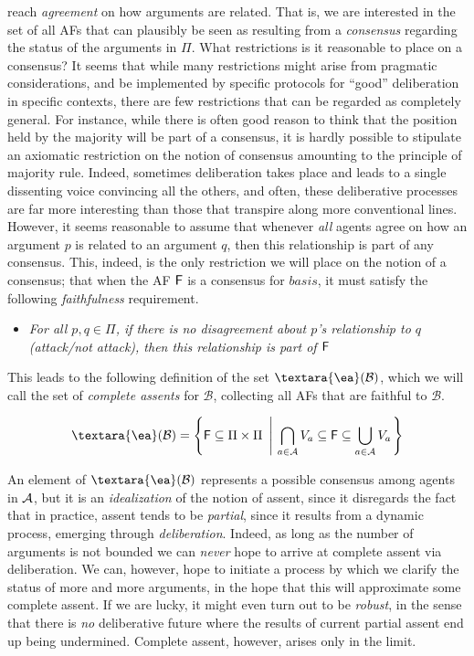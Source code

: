 \documentclass[greybox]{svmult}
\newcommand{\cons}[1]{{\textara{\ea}}(#1)}
\newcommand{\af}{{\sf F}}
\newcommand{\basis}{basis }
\newcommand{\views}{\mathcal B}
\begin{document}
 reach \emph{agreement} on how arguments are related. That is, we are interested in the set of all AFs that can plausibly be seen as resulting from a \emph{consensus} regarding the status of the arguments in $\Pi$. What restrictions is it reasonable to place on a consensus? It seems that while many restrictions might arise from pragmatic considerations, and be implemented by specific protocols for ``good'' deliberation in specific contexts, there are few restrictions that can be regarded as completely general. For instance, while there is often good reason to think that the position held by the majority will be part of a consensus, it is hardly possible to stipulate an axiomatic restriction on the notion of consensus amounting to the principle of majority rule. Indeed, sometimes deliberation takes place and leads to a single dissenting voice convincing all the others, and often, these deliberative processes are far more interesting than those that transpire along more conventional lines. However, it seems reasonable to assume that whenever \emph{all} agents agree on how an argument $p$ is related to an argument $q$, then this relationship is part of any consensus. This, indeed, is the only restriction we will place on the notion of a consensus; that when the AF $\af$ is a consensus for $\basis$, it must satisfy the following \emph{faithfulness} requirement.

\begin{itemize}
\item \emph{For all $p,q \in \Pi$, if there is no disagreement about $p$'s relationship to $q$ (attack/not attack), then this relationship is part of $\af$}
\end{itemize}

This leads to the following definition of the set $\cons \views$, which we will call the set of \emph{complete assents} for $\views$, collecting all AFs that are faithful to $\views$.

\begin{equation}\label{def:consensus}
\cons \views = \left\{\af \subseteq \Pi \times \Pi ~\left|~ \bigcap_{a \in \agents}V_a \subseteq \af \subseteq \bigcup_{a \in \agents}V_a\right.\right\}
\end{equation}

An element of $\cons \views$ represents a possible consensus among agents in $\mathcal A$, but it is an \emph{idealization} of the notion of assent, since it disregards the fact that in practice, assent tends to be \emph{partial}, since it results from a dynamic process, emerging through \emph{deliberation}. Indeed, as long as the number of arguments is not bounded we can \emph{never} hope to arrive at complete assent via deliberation. We can, however, hope to initiate a process by which we clarify the status of more and more arguments, in the hope that this will approximate some complete assent. If we are lucky, it might even turn out to be \emph{robust}, in the sense that there is \emph{no} deliberative future where the results of current partial assent end up being undermined. Complete assent, however, arises only in the limit.
\end{document}
